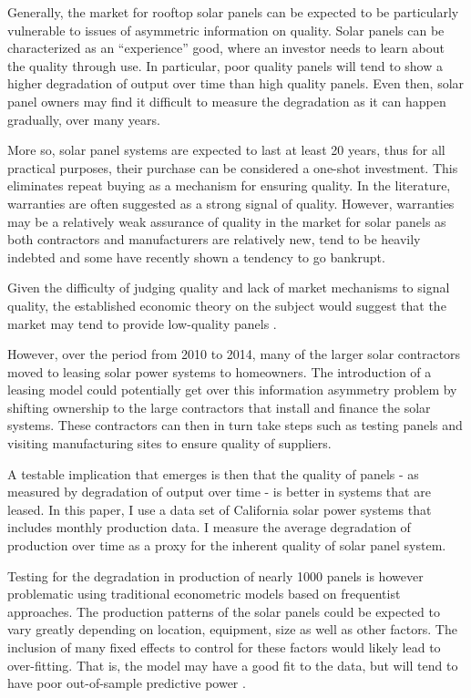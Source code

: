 \documentclass[12pt]{article}
\begin{document}
Generally, the market for rooftop solar panels can be expected to be particularly vulnerable to issues of asymmetric information on quality. Solar panels can be characterized as an ``experience'' good, where an investor needs to learn about the quality through use. In particular, poor quality panels will tend to show a higher degradation of output over time than high quality panels. Even then, solar panel owners may find it difficult to measure the degradation as it can happen gradually, over many years.

More so, solar panel systems are expected to last at least 20 years, thus for all practical purposes, their purchase can be considered a one-shot investment. This eliminates repeat buying as a mechanism for ensuring quality. In the literature, warranties are often suggested as a strong signal of quality. However, warranties may be a relatively weak assurance of quality in the market for solar panels as both contractors and manufacturers are relatively new, tend to be heavily indebted and some have recently shown a tendency to go bankrupt.

Given the difficulty of judging quality and lack of market mechanisms to signal quality, the established economic theory on the subject would suggest that the market may tend to provide low-quality panels \citet{tirole_theory_1988}.

However, over the period from 2010 to 2014, many of the larger solar contractors moved to leasing solar power systems to homeowners. The introduction of a leasing model could potentially get over this information asymmetry problem by shifting ownership to the large contractors that install and finance the solar systems. These contractors can then in turn take steps such as testing panels and visiting manufacturing sites to ensure quality of suppliers.

A testable implication that emerges is then that the quality of panels - as measured by degradation of output over time - is better in systems that are leased.  In this paper, I use a data set of California solar power systems that includes monthly production data. I measure the average degradation of production over time as a proxy for the inherent quality of solar panel system.

Testing for the degradation in production of nearly 1000 panels is however problematic using traditional econometric models based on frequentist approaches. The production patterns of the solar panels could be expected to vary greatly depending on location, equipment, size as well as other factors. The inclusion of many fixed effects to control for these factors would likely lead to over-fitting. That is, the model may have a good fit to the data, but will tend to have poor out-of-sample predictive power \citep{gelman_bayesian_2013}.
\end{document}
